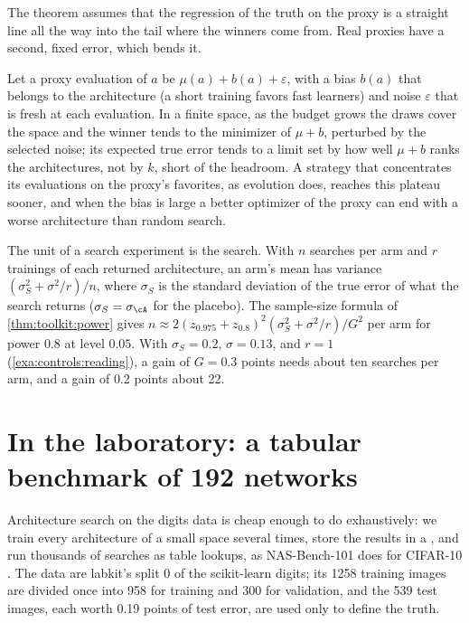 \begin{refsection}
The theorem assumes that the regression of the truth on the proxy is a straight line all the way into the tail where the winners come from. Real proxies have a second, fixed error, which bends it.

\begin{heuristic}
Let a proxy evaluation of $a$ be $\mu(a)+b(a)+\varepsilon$, with a bias $b(a)$ that belongs to the architecture (a short training favors fast learners) and noise $\varepsilon$ that is fresh at each evaluation. In a finite space, as the budget grows the draws cover the space and the winner tends to the minimizer of $\mu+b$, perturbed by the selected noise; its expected true error tends to a limit set by how well $\mu+b$ ranks the architectures, not by $k$, short of the headroom. A strategy that concentrates its evaluations on the proxy's favorites, as evolution does, reaches this plateau sooner, and when the bias is large a better optimizer of the proxy can end with a worse architecture than random search.
\end{heuristic}

\begin{remark}\label{rem:controls:power}
The unit of a search experiment is the search. With $n$ searches per arm and $r$ trainings of each returned architecture, an arm's mean has variance $(\sigma_S^2+\sigma^2/r)/n$, where $\sigma_S$ is the standard deviation of the true error of what the search returns ($\sigma_S=\sigma_{\cA}$ for the placebo). The sample-size formula of \cref{thm:toolkit:power} gives $n\approx2(z_{0.975}+z_{0.8})^2(\sigma_S^2+\sigma^2/r)/G^2$ per arm for power $0.8$ at level $0.05$. With $\sigma_S=0.2$, $\sigma=0.13$, and $r=1$ (\cref{exa:controls:reading}), a gain of $G=0.3$ points needs about ten searches per arm, and a gain of 0.2 points about 22. \end{remark}

\section{In the laboratory: a tabular benchmark of 192 networks}\label{sec:controls:lab}

Architecture search on the digits data is cheap enough to do exhaustively: we train every architecture of a small space several times, store the results in a , and run thousands of searches as table lookups, as NAS-Bench-101 does for CIFAR-10 \parencite{YingEtAl2019}. The data are labkit's split 0 of the scikit-learn digits; its 1258 training images are divided once into 958 for training and 300 for validation, and the 539 test images, each worth 0.19 points of test error, are used only to define the truth.


\end{refsection}
